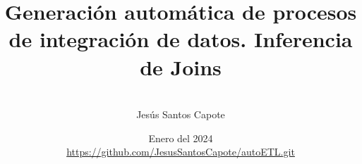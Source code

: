 \documentclass[12pt,oneside]{uhthesis}
\title{Generación automática de procesos de integración de datos. Inferencia de Joins}
\author{\\\vspace{0.25cm}Jes\'us Santos Capote}
\date{Enero del 2024\\\vspace{0.25cm}\href{https://github.com/username/repo}{https://github.com/JesusSantosCapote/autoETL.git}}
\begin{document}
\frontmatter
\maketitle







\mainmatter




% 
% 
% 



% 
% 
% 
% 
% 


% 


% 
% 
% 
\nocite{*}
\backmatter





\end{document}

